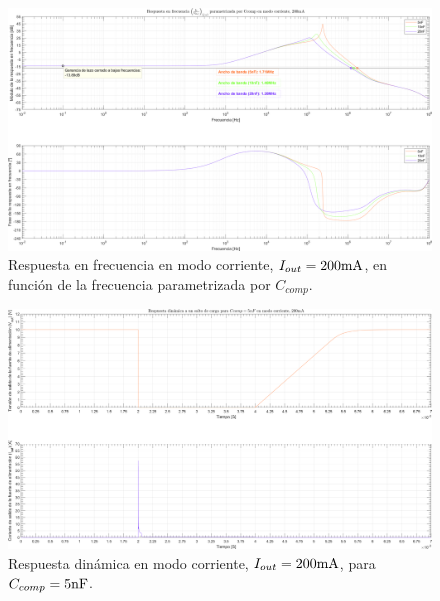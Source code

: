 \clearpage

\begin{figure}[H] %
\begin{center}
\includegraphics[width=1.1 \textwidth, angle=90]{./img/plots/rf/power_supply_CCOMP_RF_Modo4.png}
\caption{\label{fig:fig_power_supply_CCOMP_RF_Modo4}\footnotesize{Respuesta en frecuencia en modo corriente, $I_{out} = 200 \si[per-mode=symbol]{\milli\ampere}$, en función de la frecuencia parametrizada por $C_{comp}$.}}
\end{center}
\end{figure}

\clearpage

\begin{figure}[H] %
\begin{center}
\includegraphics[width=1.1 \textwidth, angle=90]{./img/plots/dynamic/power_supply_CCOMP_5n_STEP_Modo4.png}
\caption{\label{fig:fig_power_supply_CCOMP_STEP_5n_Modo4}\footnotesize{Respuesta dinámica en modo corriente, $I_{out} = 200 \si[per-mode=symbol]{\milli\ampere}$, para $C_{comp} = 5 \si[per-mode=symbol]{\nano\farad} $.}}
\end{center}
\end{figure}

